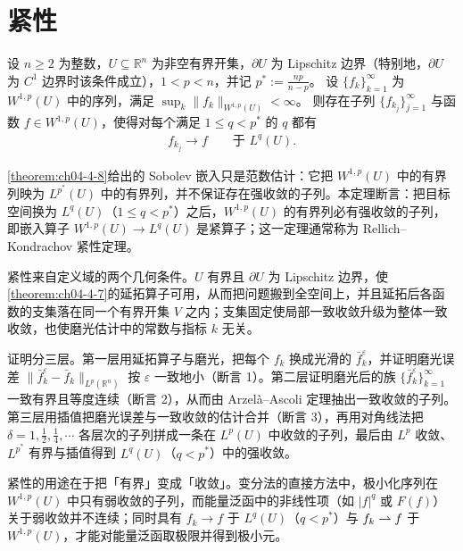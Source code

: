 ﻿\documentclass[../../main.tex]{subfiles}%
\begin{document}
\section{紧性}\label{section:ch04-06}

\begin{theorem}[紧性与 $W^{1,p}$]\label{theorem:ch04-4-11}
设 $n\geqslant2$ 为整数，$U\subseteq\mathbb{R}^n$ 为非空有界开集，$\partial U$ 为 Lipschitz 边界（特别地，$\partial U$ 为 $C^1$ 边界时该条件成立），$1<p<n$，并记 $p^*:=\frac{np}{n-p}$。
设 $\{f_k\}_{k=1}^{\infty}$ 为 $W^{1,p}(U)$ 中的序列，满足 $\sup_{k}\lVert f_k\rVert_{W^{1,p}(U)}<\infty$。
则存在子列 $\{f_{k_j}\}_{j=1}^{\infty}$ 与函数 $f\in W^{1,p}(U)$，使得对每个满足 $1\leqslant q<p^*$ 的 $q$ 都有
\begin{align*}
f_{k_j}\to f\qquad\text{于 }L^q(U).
\end{align*}
\end{theorem}

\begin{remark}\label{remark:ch04-thm-4-11-动机}
\cref{theorem:ch04-4-8}给出的 Sobolev 嵌入只是范数估计：它把 $W^{1,p}(U)$ 中的有界列映为 $L^{p^*}(U)$ 中的有界列，并不保证存在强收敛的子列。本定理断言：把目标空间换为 $L^q(U)$（$1\leqslant q<p^*$）之后，$W^{1,p}(U)$ 的有界列必有强收敛的子列，即嵌入算子 $W^{1,p}(U)\to L^q(U)$ 是紧算子；这一定理通常称为 Rellich--Kondrachov 紧性定理。%

紧性来自定义域的两个几何条件。$U$ 有界且 $\partial U$ 为 Lipschitz 边界，使\cref{theorem:ch04-4-7}的延拓算子可用，从而把问题搬到全空间上，并且延拓后各函数的支集落在同一个有界开集 $V$ 之内；支集固定使局部一致收敛升级为整体一致收敛，也使磨光估计中的常数与指标 $k$ 无关。%

证明分三层。第一层用延拓算子与磨光，把每个 $f_k$ 换成光滑的 $\bar f_k^\varepsilon$，并证明磨光误差 $\lVert\bar f_k^\varepsilon-\bar f_k\rVert_{L^p(\mathbb{R}^n)}$ 按 $\varepsilon$ 一致地小（断言 1）。第二层证明磨光后的族 $\{\bar f_k^\varepsilon\}_{k=1}^{\infty}$ 一致有界且等度连续（断言 2），从而由 Arzelà--Ascoli 定理抽出一致收敛的子列。第三层用插值把磨光误差与一致收敛的估计合并（断言 3），再用对角线法把 $\delta=1,\frac12,\frac14,\cdots$ 各层次的子列拼成一条在 $L^p(U)$ 中收敛的子列，最后由 $L^p$ 收敛、$L^{p^*}$ 有界与插值得到 $L^q(U)$（$q<p^*$）中的强收敛。

紧性的用途在于把「有界」变成「收敛」。变分法的直接方法中，极小化序列在 $W^{1,p}(U)$ 中只有弱收敛的子列，而能量泛函中的非线性项（如 $\lvert f\rvert^q$ 或 $F(f)$）关于弱收敛并不连续；同时具有 $f_k\to f$ 于 $L^q(U)$（$q<p^*$）与 $f_k\rightharpoonup f$ 于 $W^{1,p}(U)$，才能对能量泛函取极限并得到极小元。
\end{remark}
\end{document}
